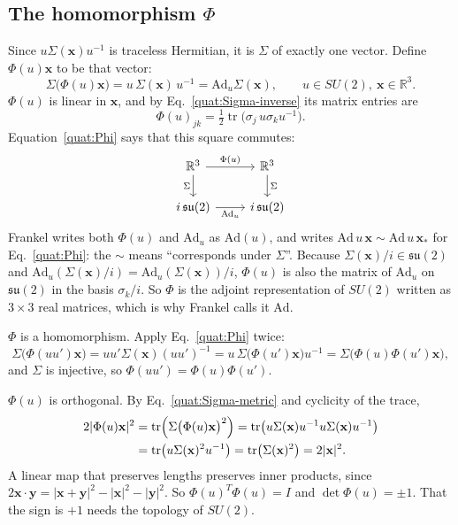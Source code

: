 \subsection{The homomorphism \texorpdfstring{$\Phi$}{Phi}}
Since $u\Sigma(\mathbf x)u^{-1}$ is traceless Hermitian, it is
$\Sigma$ of exactly one vector. Define $\Phi(u)\mathbf x$ to be that vector:
\begin{equation}\label{quat:Phi}
 \Sigma\bigl(\Phi(u)\mathbf x\bigr)=u\,\Sigma(\mathbf x)\,u^{-1}
 =\mathrm{Ad}_u\Sigma(\mathbf x),
 \qquad u\in SU(2),\ \mathbf x\in\mathbb R^3 .
\end{equation}
$\Phi(u)$ is linear in $\mathbf x$, and by Eq.~\eqref{quat:Sigma-inverse}
its matrix entries are
\begin{equation}\label{quat:Phi-entries}
 \Phi(u)_{jk}=\tfrac12\operatorname{tr}\bigl(\sigma_j\,u\sigma_ku^{-1}\bigr).
\end{equation}
Equation~\eqref{quat:Phi} says that this square commutes:
\begin{equation}
\begin{tikzcd}
 \mathbb R^3 \arrow[r,"\Phi(u)"] \arrow[d,"\Sigma"'] &
 \mathbb R^3 \arrow[d,"\Sigma"]\\
 i\,\mathfrak{su}(2) \arrow[r,"\mathrm{Ad}_u"'] & i\,\mathfrak{su}(2)
\end{tikzcd}
\end{equation}
Frankel writes both $\Phi(u)$ and $\mathrm{Ad}_u$ as $\mathrm{Ad}(u)$, and
writes $\mathrm{Ad}\,u\,\mathbf x\sim\mathrm{Ad}\,u\,\mathbf x_*$ for
Eq.~\eqref{quat:Phi}: the $\sim$ means ``corresponds under $\Sigma$''.
Because $\Sigma(\mathbf x)/i\in\mathfrak{su}(2)$ and
$\mathrm{Ad}_u(\Sigma(\mathbf x)/i)=\mathrm{Ad}_u(\Sigma(\mathbf x))/i$,
$\Phi(u)$ is also the matrix of $\mathrm{Ad}_u$ on $\mathfrak{su}(2)$ in
the basis $\sigma_k/i$. So $\Phi$ is the adjoint representation of $SU(2)$
written as $3\times3$ real matrices, which is why Frankel calls it
$\mathrm{Ad}$.

$\Phi$ is a homomorphism. Apply Eq.~\eqref{quat:Phi} twice:
\begin{equation}
 \Sigma\bigl(\Phi(uu')\mathbf x\bigr)=uu'\Sigma(\mathbf x)(uu')^{-1}
 =u\,\Sigma\bigl(\Phi(u')\mathbf x\bigr)u^{-1}
 =\Sigma\bigl(\Phi(u)\Phi(u')\mathbf x\bigr),
\end{equation}
and $\Sigma$ is injective, so $\Phi(uu')=\Phi(u)\Phi(u')$.

$\Phi(u)$ is orthogonal. By Eq.~\eqref{quat:Sigma-metric} and cyclicity of
the trace,
\begin{align}
 2|\Phi(u)\mathbf x|^2
 &=\operatorname{tr}\Bigl(\Sigma\bigl(\Phi(u)\mathbf x\bigr)^2\Bigr)
  =\operatorname{tr}\bigl(u\Sigma(\mathbf x)u^{-1}u\Sigma(\mathbf x)u^{-1}\bigr)\notag\\
 &=\operatorname{tr}\bigl(u\Sigma(\mathbf x)^2u^{-1}\bigr)
  =\operatorname{tr}\bigl(\Sigma(\mathbf x)^2\bigr)=2|\mathbf x|^2 .
\end{align}
A linear map that preserves lengths preserves inner products, since
$2\mathbf x\cdot\mathbf y=|\mathbf x+\mathbf y|^2-|\mathbf x|^2-|\mathbf y|^2$.
So $\Phi(u)^T\Phi(u)=I$ and $\det\Phi(u)=\pm1$. That the sign is $+1$
needs the topology of $SU(2)$.

